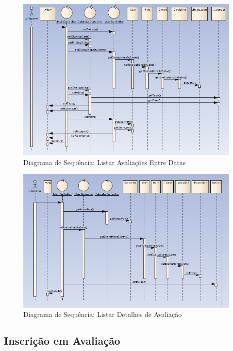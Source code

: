 \begin{figure}[!htbp]
\centering
\includegraphics{imagens/listar_entre_datas.jpg}
\caption{Diagrama de Sequência: Listar Avaliações Entre Datas}
\label{fig:listar_entre_datas}
\end{figure}

\begin{figure}[!htbp]
\centering
\includegraphics{imagens/listar_detalhes.jpg}
\caption{Diagrama de Sequência: Listar Detalhes de Avaliação}
\label{fig:listar_detalhes}
\end{figure}



\clearpage
\subsection{Inscrição em Avaliação}

